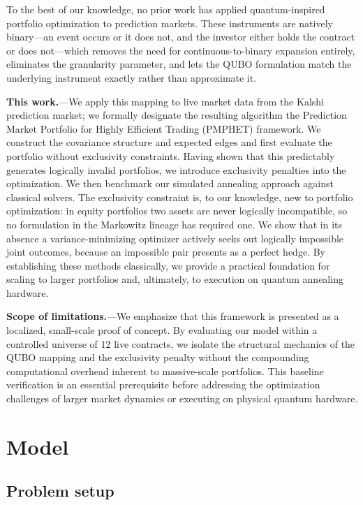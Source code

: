 \documentclass[aps, reprint, prl, twocolumn, superscriptaddress,amsmath,amssymb,noeprint]{revtex4-2}
\begin{document}
To the best of our knowledge, no prior work has applied quantum-inspired
portfolio optimization to prediction markets.  These instruments are
natively binary---an event occurs or it does not, and the investor either
holds the contract or does not---which removes the need for
continuous-to-binary expansion entirely, eliminates the granularity
parameter, and lets the QUBO formulation match the underlying instrument
exactly rather than approximate it.

\textbf{This work.}---We apply this mapping to live market data from the
Kalshi prediction market; we formally designate the resulting algorithm
the Prediction Market Portfolio for Highly Efficient Trading (PMPHET)
framework.  We construct the covariance structure and expected edges and
first evaluate the portfolio without exclusivity constraints.  Having
shown that this predictably generates logically invalid portfolios, we
introduce exclusivity penalties into the optimization.  We then benchmark
our simulated annealing approach against classical solvers.  The
exclusivity constraint is, to our knowledge, new to portfolio
optimization: in equity portfolios two assets are never logically
incompatible, so no formulation in the Markowitz lineage has required
one.  We show that in its absence a variance-minimizing optimizer
actively seeks out logically impossible joint outcomes, because an
impossible pair presents as a perfect hedge.  By establishing these
methods classically, we provide a practical foundation for scaling to
larger portfolios and, ultimately, to execution on quantum annealing
hardware.

\textbf{Scope of limitations.}---We emphasize that this framework is
presented as a localized, small-scale proof of concept.  By evaluating
our model within a controlled universe of 12 live contracts, we isolate
the structural mechanics of the QUBO mapping and the exclusivity penalty
without the compounding computational overhead inherent to massive-scale
portfolios.  This baseline verification is an essential prerequisite
before addressing the optimization challenges of larger market dynamics
or executing on physical quantum hardware.

\section{Model}\subsection{Problem setup}
\end{document}
